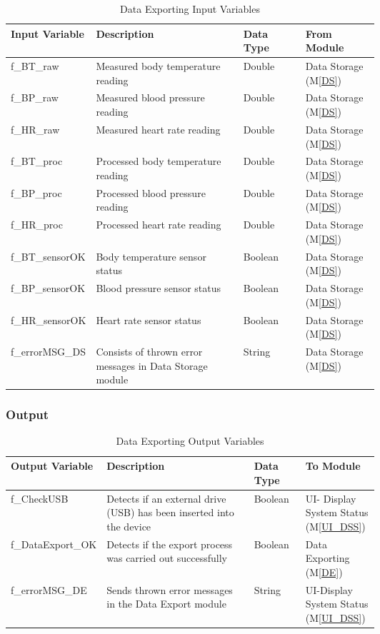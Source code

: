 \documentclass{article}
\begin{document}
\begin{description}
            \begin{longtable}{|l|p{0.4\linewidth}|l|p{0.2\linewidth}|}
            \caption{Data Exporting Input Variables}
            \hline
            \textbf{Input Variable} & \textbf{Description} & \textbf {Data Type} & \textbf{From Module} \\
            \endhead
            \hline
            f\_BT\_raw   & Measured body temperature reading & Double & Data Storage (M\ref{DS}) \\
            \hline
            f\_BP\_raw   & Measured blood pressure reading & Double & Data Storage (M\ref{DS}) \\
            \hline
            f\_HR\_raw   & Measured heart rate reading & Double & Data Storage (M\ref{DS}) \\
            \hline
            f\_BT\_proc   & Processed body temperature reading & Double & Data Storage (M\ref{DS}) \\
            \hline
            f\_BP\_proc   & Processed blood pressure reading & Double & Data Storage (M\ref{DS}) \\
            \hline
            f\_HR\_proc   & Processed heart rate reading & Double & Data Storage (M\ref{DS}) \\
            \hline
            f\_BT\_sensorOK   & Body temperature sensor status & Boolean & Data Storage (M\ref{DS}) \\
            \hline
            f\_BP\_sensorOK   & Blood pressure sensor status & Boolean & Data Storage (M\ref{DS}) \\
            \hline
            f\_HR\_sensorOK   & Heart rate sensor status & Boolean & Data Storage (M\ref{DS}) \\
            \hline
            f\_errorMSG\_DS   & Consists of thrown error messages in Data Storage module  & String & Data Storage (M\ref{DS}) \\
            \hline
            \end{longtable}
        \subsubsection{Output}
            
            \begin{longtable}{|l|p{0.4\linewidth}|l|p{0.2\linewidth}|}
            \caption{Data Exporting Output Variables}
            \hline
            \textbf{Output Variable} & \textbf{Description} & \textbf {Data Type} & \textbf{To Module} \\
            \endhead
            \hline
             f\_CheckUSB   & Detects if an external drive (USB) has been inserted into the device  & Boolean & UI- Display System Status (M\ref{UI_DSS})\\ \hline
            f\_DataExport\_OK   & Detects if the export process was carried out successfully & Boolean & Data Exporting (M\ref{DE})\\ \hline
            f\_errorMSG\_DE & Sends thrown error messages in the Data Export module  & String & UI-Display System Status (M\ref{UI_DSS})\\
            \hline
            \end{longtable}
        \newpage

\end{description}
\end{document}
